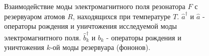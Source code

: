 \begin{figure}
\centering



\caption{Взаимодействие моды электромагнитного поля резонатора $F$ с
  резервуаром атомов $R$, находящихся при температуре $T$. $\hat{a}^{\dag}$ и
$\hat{a}$ - операторы рождения и уничтожения исследуемой моды
электромагнитного поля. $\hat{b}_k^{\dag}$ и
$\hat{b}_k$ - операторы рождения и уничтожения $k$-ой моды резервуара (фононов).}
\label{figPart1Ch2_add3}
\end{figure}
